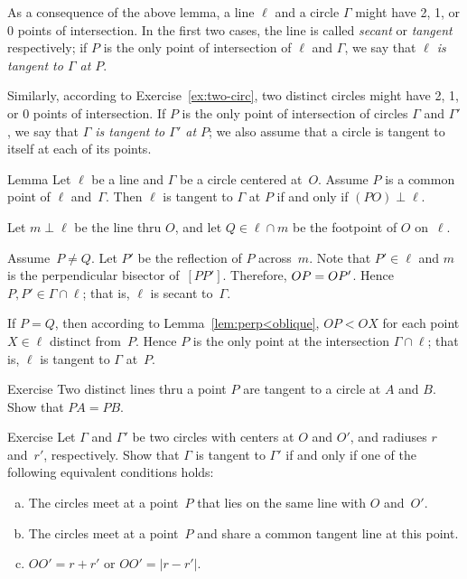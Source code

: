 As a consequence of the above lemma, 
a line $\ell$ and a circle $\Gamma$ might have 2, 1, or 0 points of intersection.
In the first two cases, the line is called \emph{secant} or \emph{tangent} respectively;
if $P$ is the only point of intersection of $\ell$ and $\Gamma$,
we say that \textit{$\ell$ is tangent to $\Gamma$ at $P$}. 

Similarly, according to Exercise~\ref{ex:two-circ},
two distinct circles might have 2, 1, or 0 points of intersection.
If $P$ is the only point of intersection of circles $\Gamma$ and $\Gamma'$,
we say that \emph{$\Gamma$ is tangent to $\Gamma'$ at $P$}; we also assume that a circle is tangent to itself at each of its points.

\begin{thm}[\abs]{Lemma}\label{lem:tangent}
Let $\ell$ be a line and $\Gamma$ be a circle centered at~$O$.
Assume $P$ is a common point of $\ell$ and~$\Gamma$. 
Then $\ell$ is tangent to $\Gamma$ at $P$ if and only if $(PO)\perp \ell$.
\end{thm}

Let $m\perp \ell$ be the line thru $O$, and let $Q\in \ell\cap m$ be the footpoint of $O$ on~$\ell$.

Assume~$P\ne Q$.
Let $P'$ be the reflection of $P$ across~$m$.
Note that $P'\in\ell$ and $m$ is the perpendicular bisector of~$[PP']$.
Therefore, $OP\z=OP'$.
Hence $P,P'\in \Gamma\cap \ell$;
that is, $\ell$ is secant to~$\Gamma$.

If $P=Q$, 
then according to Lemma~\ref{lem:perp<oblique},
$OP<OX$ for each point $X\in \ell$ distinct from~$P$.
Hence $P$ is the only point at the intersection $\Gamma\cap\ell$;
that is, $\ell$ is tangent to $\Gamma$ at~$P$. 
\qeds

\begin{thm}{Exercise}\label{ex:equal-tangents}
Two distinct lines thru a point $P$ are tangent to a circle at $A$ and $B$.
Show that $PA=PB$.
\end{thm}

\begin{thm}[!]{Exercise}\label{ex:tangent-circles}
Let $\Gamma$ and $\Gamma'$ be two circles with centers at $O$ and $O'$, and radiuses $r$ and~$r'$, respectively.
Show that $\Gamma$ is tangent to $\Gamma'$ if and only if one of the following equivalent conditions holds:
\begin{enumerate}[(a)]
\item\label{ex:tangent-circles:a} The circles meet at a point~$P$ that lies on the same line with $O$ and~$O'$.
\item\label{ex:tangent-circles:b} The circles meet at a point~$P$ and share a common tangent line at this point.
\item\label{ex:tangent-circles-2} $OO' = r + r'$ or $OO' = |r - r'|$.
\end{enumerate}

\end{thm}

